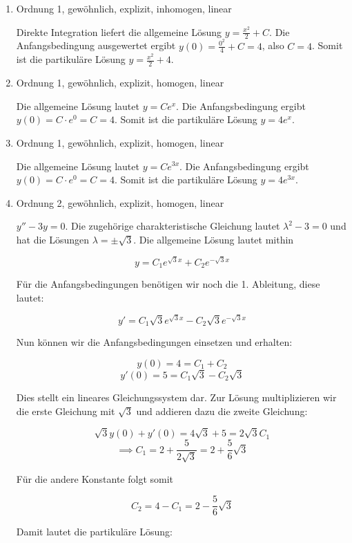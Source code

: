 \item

\begin{enumerate}
\item Ordnung 1, gewöhnlich, explizit, inhomogen, linear

Direkte Integration liefert die allgemeine Lösung $y=\frac{x^2}{2}+C$. Die Anfangsbedingung ausgewertet ergibt $y(0)=\frac{0^2}{4}+C=4$, also $C=4$. Somit ist die partikuläre Lösung $y=\frac{x^2}{2}+4$.

\item Ordnung 1, gewöhnlich, explizit, homogen, linear

Die allgemeine Lösung lautet $y=C e^x$. Die Anfangsbedingung ergibt $y(0)=C\cdot e^0 = C = 4$. Somit ist die partikuläre Lösung $y=4e^x$.

\item Ordnung 1, gewöhnlich, explizit, homogen, linear

Die allgemeine Lösung lautet $y=C e^{3x}$. Die Anfangsbedingung ergibt $y(0)=C\cdot e^0 = C = 4$. Somit ist die partikuläre Lösung $y = 4 e^{3x}$.

\item Ordnung 2, gewöhnlich, explizit, homogen, linear

$y''-3y=0$. Die zugehörige charakteristische Gleichung lautet $\lambda^2-3 = 0$ und hat die Lösungen $\lambda = \pm \sqrt{3}$. Die allgemeine Lösung lautet mithin

$$y=C_1 e^{\sqrt{3}x} + C_2 e^{-\sqrt{3}x}$$

Für die Anfangsbedingungen benötigen wir noch die 1. Ableitung, diese lautet:

$$y'= C_1 \sqrt{3} e^{\sqrt{3}x} - C_2 \sqrt{3} e^{-\sqrt{3}x}$$

Nun können wir die Anfangsbedingungen einsetzen und erhalten:

$$y(0) = 4 = C_1 + C_2$$
$$y'(0) = 5 = C_1 \sqrt{3} - C_2 \sqrt{3}$$

Dies stellt ein lineares Gleichungssystem dar. Zur Lösung multiplizieren wir die erste Gleichung mit $\sqrt{3}$ und addieren dazu die zweite Gleichung:

$$\sqrt{3}y(0)+y'(0) = 4\sqrt{3} + 5 = 2\sqrt{3}C_1$$
$$\implies C_1 = 2 + \frac{5}{2\sqrt{3}} = 2 + \frac{5}{6}\sqrt{3}$$

Für die andere Konstante folgt somit

$$C_2 = 4 - C_1 = 2 - \frac{5}{6}\sqrt{3}$$

Damit lautet die partikuläre Lösung:


\end{enumerate}
